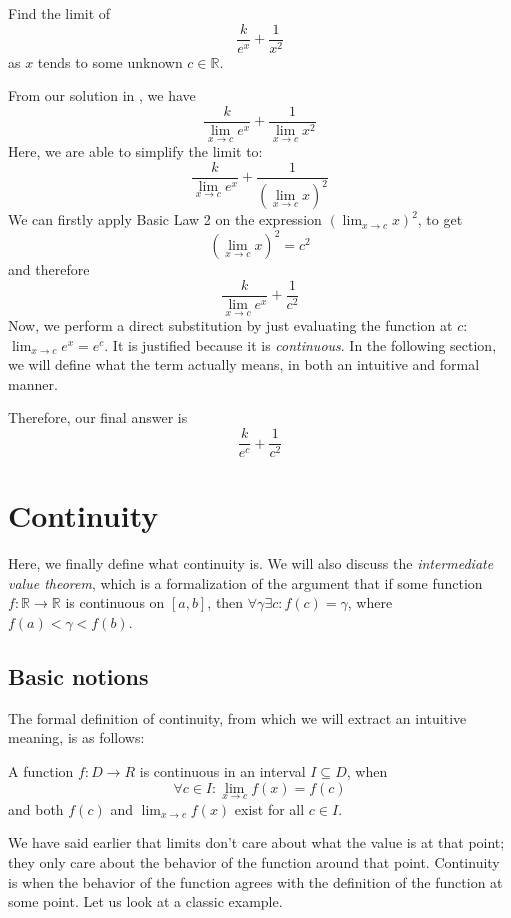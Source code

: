\begin{example}
    Find the limit of \[\frac{k}{e^x} + \frac{1}{x^2}\] as $x$ tends to some unknown $c \in \mathbb{R}$.
\end{example}
\begin{solution}
    From our solution in , we have
    \[\frac{k}{\lim_{x \to c} e^x} + \frac{1}{\lim_{x \to c} x^2}\]
    Here, we are able to simplify the limit to:
    \[\frac{k}{\lim_{x \to c} e^x} + \frac{1}{(\lim_{x \to c} x)^2}\]
    We can firstly apply Basic Law 2 on the expression $(\lim_{x \to c} x)^2$, to get
    \[(\lim_{x \to c} x)^2 = c^2\]
    and therefore
    \[\frac{k}{\lim_{x \to c} e^x} + \frac{1}{c^2}\]
    Now, we perform a direct substitution
    by just evaluating the function at $c$: $\lim_{x \to c} e^x = e^c$. It is justified because it is \textit{continuous}.
    In the following section, we will define what the term actually means, in both an intuitive and formal manner.

    Therefore, our final answer is
    \[\frac{k}{e^c} + \frac{1}{c^2}\]
\end{solution}

\section{Continuity}
Here, we finally define what continuity is. We will also discuss the \textit{intermediate value theorem},
which is a formalization of the argument that if some function $f : \mathbb{R} \to \mathbb{R}$ is
continuous on $[a, b]$, then $\forall \gamma \exists c : f(c) = \gamma$, where $f(a) < \gamma < f(b)$.

\subsection{Basic notions}

The formal definition of continuity, from which we will extract an intuitive meaning, is as follows:
\begin{definition}
    A function $f : D \to R$ is continuous in an interval $I \subseteq D$, when
    \[\forall c \in I : \lim_{x \to c} f(x) = f(c)\]
    and both $f(c)$ and $\lim_{x \to c} f(x)$ exist for all $c \in I$.
\end{definition}

We have said earlier that limits don't care about what the value is at that point; they only care
about the behavior of the function around that point. Continuity is when the behavior of the function
agrees with the definition of the function at some point. Let us look at a classic example.

